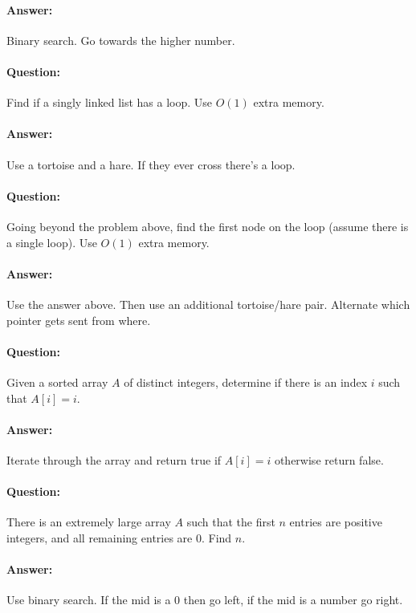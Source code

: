 \documentclass{article}
\begin{document}
\paragraph{Answer:} Binary search. Go towards the higher number.

\paragraph{Question:} Find if a singly linked list has a loop. Use \(O(1)\) extra memory.

\paragraph{Answer:} Use a tortoise and a hare. If they ever cross there's a loop.

\paragraph{Question:} Going beyond the problem above, find the first node on the loop (assume there is a single loop). Use \(O(1)\) extra memory.

\paragraph{Answer:} Use the answer above. Then use an additional tortoise/hare pair. Alternate which pointer gets sent from where.

\paragraph{Question:} Given a sorted array \(A\) of distinct integers, determine if there is an index \(i\) such that \(A[i] = i\).

\paragraph{Answer:} Iterate through the array and return true if \(A[i] = i\) otherwise return false.

\paragraph{Question:} There is an extremely large array \(A\) such that the first \(n\) entries are positive integers, and all remaining entries are \(0\). Find \(n\).

\paragraph{Answer:} Use binary search. If the mid is a 0 then go left, if the mid is a number go right.
\end{document}
